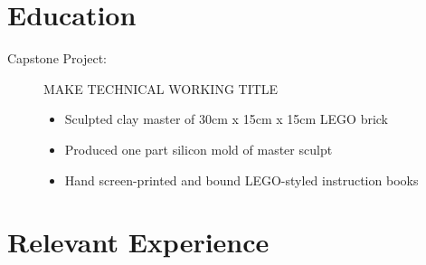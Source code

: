 \documentclass[a4paper]{deedy-resume} %
\begin{document}
    
    
    
    
    
    \section{Education}
    

    \begin{description}
        \item[Capstone Project:] MAKE TECHNICAL WORKING TITLE
        \begin{itemize}
            \item Sculpted clay master of 30cm x 15cm x 15cm LEGO brick
            \item Produced one part silicon mold of master sculpt
            \item Hand screen-printed and bound LEGO-styled instruction books
        \end{itemize}
    \end{description}
    
    \sectionspace %


    \section{Relevant Experience}
\end{document}
